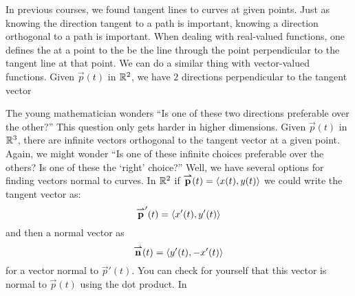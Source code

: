 \documentclass{ximera}
\begin{document}
In previous courses, we found tangent lines to curves at given points.
Just as knowing the direction tangent to a path is important, knowing
a direction orthogonal to a path is important. When dealing with
real-valued functions, one defines the  at a point to
the be the line through the point perpendicular to the tangent line at
that point. We can do a similar thing with vector-valued
functions. Given $\vec{p}(t)$ in $\mathbb R^2$, we have $2$ directions
perpendicular to the tangent vector
\begin{image}
\end{image}
The young mathematician wonders ``Is one of these two directions
preferable over the other?''  This question only gets harder in higher
dimensions.  Given $\vec{p}(t)$ in $\mathbb R^3$, there are infinite vectors
orthogonal to the tangent vector at a given point. Again, we might
wonder ``Is one of these infinite choices preferable over the others?
Is one of these the `right' choice?'' Well, we have several options
for finding vectors normal to curves. In $\mathbb R^2$ if ${\overset{\boldsymbol{\rightharpoonup}}{\mathbf{p}}}(t) =
\left\langle x(t),y(t)\right\rangle$ we could write the tangent vector as:
\[
{\overset{\boldsymbol{\rightharpoonup}}{\mathbf{p}}}'(t) =\left\langle x'(t),y'(t)\right\rangle
\]
and then a normal vector as
\[
{\overset{\boldsymbol{\rightharpoonup}}{\mathbf{n}}}(t) = \left\langle y'(t),-x'(t)\right\rangle
\]
for a vector normal to $\vec{p}'(t)$. You can check for yourself that
this vector is normal to $\vec{p}(t)$ using the dot product. In
\end{document}

